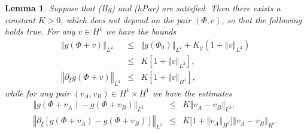 \documentclass[10pt]{articleHJ}
\newcommand{\norm}[1]{\left\Vert#1\right\Vert}		%
\newtheorem{lem}[thm]{Lemma}
\numberwithin{equation}{section}
\begin{document}
\begin{lem}
\label{lem:prlm:ests:g}
Suppose that (Hg) and (hPar) are satisfied.
Then there exists a constant $K > 0$, which does not
depend on the pair $(\Phi, c)$, so that the following holds true.
For any $v \in H^1$
we have the bounds
\begin{equation}
 \label{eq:prlm:g:l2:bnds}
    \begin{array}{lcl}
      \norm{g(\Phi + v)}_{L^2}  & \le &
        \norm{g(\Phi_{0}) }_{L^2}
               + K_g (1 + \norm{v}_{L^2} )
\\[0.2cm]
& \le &
        K [1 + \norm{v}_{L^2}] ,
     \\[0.2cm]
     \norm{\partial_\xi g(\Phi + v)}_{L^2}  & \le &
        K [1 + \norm{v}_{H^1}] ,
    \end{array}
\end{equation}
while for any pair $(v_A, v_B ) \in H^1 \times H^1$
we have the estimates
\begin{equation}
  \label{eq:lem:prlm:g:lipschitz}
    \begin{array}{lcl}
      \norm{g(\Phi + v_A) - g(\Phi + v_B) }_{L^2} & \le &
        K \norm{v_A - v_B}_{L^2} ,
       \\[0.2cm]
       \norm{\partial_\xi [ g(\Phi + v_A) - g(\Phi + v_B) ]}_{L^2}
       & \le &
        K \big[ 1 + \norm{v_A}_{H^1}  \big] \norm{v_A - v_B}_{H^1} .
    \end{array}
\end{equation}
\end{lem}
\end{document}
